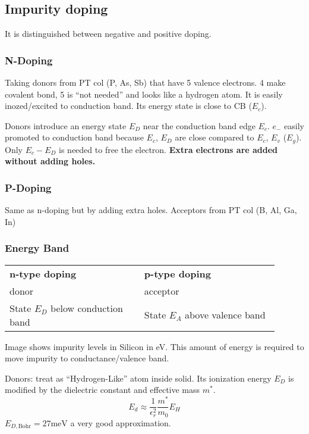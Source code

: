\documentclass[a4paper, fontsize=8pt, landscape, DIV=1]{scrartcl}
\begin{document}
\begin{multicols*}{4}
  \subsection{Impurity doping}
  It is distinguished between negative and positive doping.
  
  \subsubsection{N-Doping}
  Taking donors from PT col  (P, As, Sb) that have 5 valence electrons. 4 make covalent bond, 5 is ``not needed'' and looks like a hydrogen atom. It is easily inozed/excited to conduction band. Its energy state is close to CB ($E_c$).
  \attention
  
  Donors introduce an energy state $E_D$ near the conduction band edge $E_c$. $e_-$ easily promoted to conduction band because $E_c$, $E_D$ are close compared to $E_c$, $E_v$ ($E_g$). Only $E_c-E_D$ is needed to free the electron. \textbf{Extra electrons are added without adding holes.}

  \subsubsection{P-Doping}
  Same as n-doping but by adding extra holes. Acceptors from PT col  (B, Al, Ga, In)

  \subsubsection{Energy Band}
    \begin{tabular}[h]{p{0.45\linewidth} | p{0.45\linewidth}}
    \textbf{n-type doping} & \textbf{p-type doping} \\
    donor & acceptor \\
    State $E_D$ below conduction band & State $E_A$ above valence band \\

  \end{tabular}

  Image shows impurity levels in Silicon in eV. This amount of energy is required to move impurity to conductance/valence band.

  Donors: treat as ``Hydrogen-Like'' atom inside solid. Its ionization energy $E_D$ is modified by the dielectric constant and effective mass $m^*$.
  \[E_d\approx \frac{1}{\epsilon_r^2}\frac{m^*}{m_0}E_H\]
  $E_{D,\text{Bohr}} = 27\text{meV}$ a very good approximation.


\end{multicols*}
\end{document}

